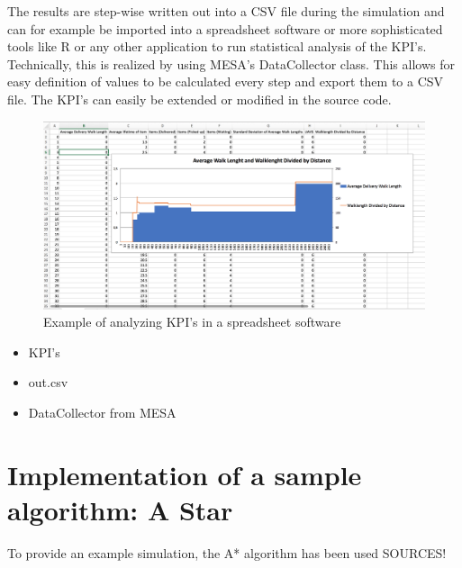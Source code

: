 The results are step-wise written out into a CSV file during the simulation and can for example be imported into a spreadsheet software or more sophisticated tools like R or any other application to run statistical analysis of the KPI's. Technically, this is realized by using MESA's DataCollector class. This allows for easy definition of values to be calculated every step and export them to a CSV file. The KPI's can easily be extended or modified in the source code.

\begin{figure}[htbp]
	\centering
	\includegraphics[scale=0.4]{images/walk}
	\caption{Example of analyzing KPI's in a spreadsheet software}
\end{figure}

\begin{itemize}
	\item KPI's
	\item out.csv
	\item DataCollector from MESA
	
\end{itemize}

\section{Implementation of a sample algorithm: A Star}\label{sec:algorithm}
To provide an example simulation, the A* algorithm has been used 
SOURCES!


